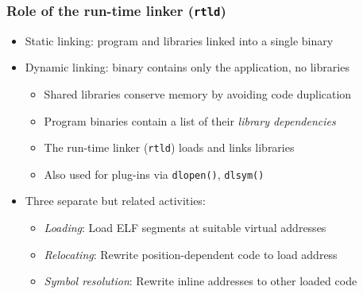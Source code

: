 \begin{frame}[fragile]
  \frametitle{Role of the run-time linker (\texttt{rtld})}

  \pause

  \begin{itemize}
    \item Static linking: program and libraries linked into a single binary

    \medskip
    \pause

    \item Dynamic linking: binary contains only the application, no libraries
    \begin{itemize}
      \item Shared libraries conserve memory by avoiding code duplication
      \item Program binaries contain a list of their \textit{library
	dependencies}
      \item The run-time linker (\texttt{rtld}) loads and links libraries
      \item Also used for plug-ins via \texttt{dlopen()}, \texttt{dlsym()}
    \end{itemize}

    \medskip
    \pause

    \item Three separate but related activities:
    \begin{itemize}
      \item \textit{Loading}: Load ELF segments at suitable virtual addresses
      \item \textit{Relocating}: Rewrite position-dependent code to load
	address
      \item \textit{Symbol resolution}: Rewrite inline addresses to other
	loaded code
    \end{itemize}
  \end{itemize}
\end{frame}

